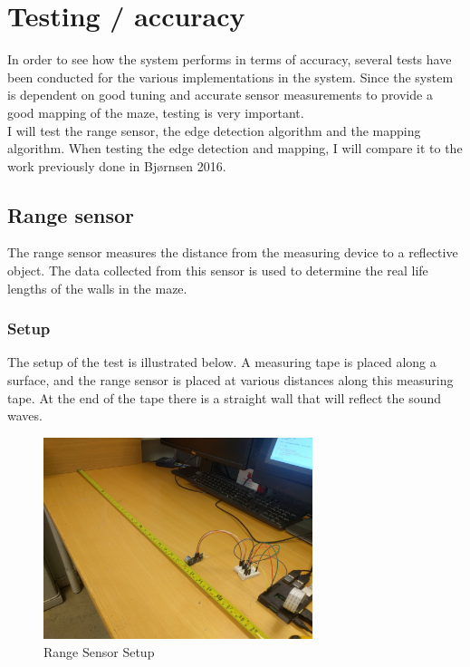 \section{Testing / accuracy}
In order to see how the system performs in terms of accuracy, several tests have been conducted for the various implementations in the system. Since the system is dependent on good tuning and accurate sensor measurements to provide a good mapping of the maze, testing is very important. \\

I will test the range sensor, the edge detection algorithm and the mapping algorithm. When testing the edge detection and mapping, I will compare it to the work previously done in Bjørnsen 2016\cite{kris}. 

\subsection{Range sensor}
The range sensor measures the distance from the measuring device to a reflective object. The data collected from this sensor is used to determine the real life lengths of the walls in the maze.

\subsubsection{Setup}
The setup of the test is illustrated below. A measuring tape is placed along a surface, and the range sensor is placed at various distances along this measuring tape. At the end of the tape there is a straight wall that will reflect the sound waves.
\begin{figure}[H]
  \centering
  \includegraphics[width=0.7\textwidth]{fig/rangesetup}
  \caption{Range Sensor Setup}
  \label{fig:rsetup}
\end{figure}

